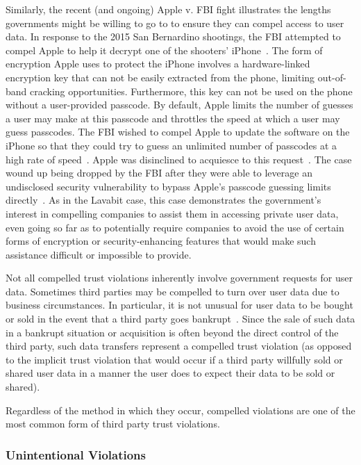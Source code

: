 Similarly, the recent (and ongoing) Apple v. FBI fight illustrates the
lengths governments might be willing to go to to ensure they can
compel access to user data.  In response to the 2015 San Bernardino
shootings, the FBI attempted to compel Apple to help it decrypt one of
the shooters' iPhone~\cite{ars-cookvfbi}. The form of encryption Apple
uses to protect the iPhone involves a hardware-linked encryption key
that can not be easily extracted from the phone, limiting out-of-band
cracking opportunities. Furthermore, this key can not be used on the
phone without a user-provided passcode. By default, Apple limits the
number of guesses a user may make at this passcode and throttles the
speed at which a user may guess passcodes. The FBI wished to compel
Apple to update the software on the iPhone so that they could try to
guess an unlimited number of passcodes at a high rate of
speed~\cite{eff-applecrypto}. Apple was disinclined to acquiesce to
this request~\cite{apple-fbiletter}. The case wound up being dropped
by the FBI after they were able to leverage an undisclosed security
vulnerability to bypass Apple's passcode guessing limits
directly~\cite{ars-fbi-greyhats, ars-fbi-breakthrough}. As in the
Lavabit case, this case demonstrates the government's interest in
compelling companies to assist them in accessing private user data,
even going so far as to potentially require companies to avoid the use
of certain forms of encryption or security-enhancing features that
would make such assistance difficult or impossible to provide.

Not all compelled trust violations inherently involve government
requests for user data. Sometimes third parties may be compelled to
turn over user data due to business circumstances. In particular, it
is not unusual for user data to be bought or sold in the event that a
third party goes bankrupt~\cite{singer2015, solove2015,
  nguyen2004}. Since the sale of such data in a bankrupt situation or
acquisition is often beyond the direct control of the third party,
such data transfers represent a compelled trust violation (as opposed
to the implicit trust violation that would occur if a third party
willfully sold or shared user data in a manner the user does to expect
their data to be sold or shared).

Regardless of the method in which they occur, compelled violations are
one of the most common form of third party trust violations.

\subsubsection{Unintentional Violations}

